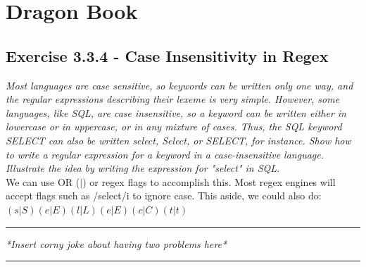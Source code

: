 \documentclass[letterpaper, 10pt]{article}
\begin{document}
\section{Dragon Book}
\subsection{Exercise 3.3.4 - Case Insensitivity in Regex}
\textit{Most languages are case sensitive, so keywords can be written 
only one way, and the regular expressions describing their lexeme is very simple. However, some languages, like SQL, are case insensitive, so a keyword can be written either in lowercase or in uppercase, or in any mixture of cases. Thus, the SQL keyword SELECT can also be written select, Select, or SELECT, for instance. Show how to write a regular expression for a keyword in a case-insensitive language. Illustrate the idea by writing the expression for "select" in SQL.} \\
\newline
We can use OR ($|$) or regex flags to accomplish this. Most regex engines will accept flags such as /select/i to ignore case. This aside, we could also do: $(s|S)(e|E)(l|L)(e|E)(c|C)(t|t)$ \\

\hrule
\vspace{.25cm}
\textit{*Insert corny joke about having two problems here*}
\vspace{.25cm}
\hrule
\end{document}
